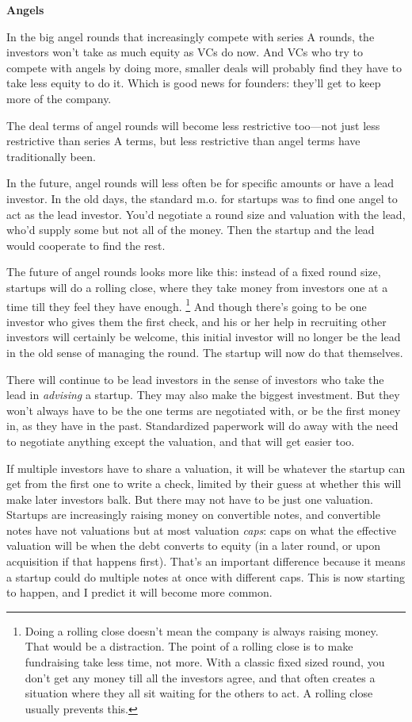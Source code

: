 \textbf{Angels}

In the big angel rounds that increasingly compete with series A rounds,
the investors won't take as much equity as VCs do now. And VCs who try
to compete with angels by doing more, smaller deals will probably find
they have to take less equity to do it. Which is good news for founders:
they'll get to keep more of the company.

The deal terms of angel rounds will become less restrictive too---not
just less restrictive than series A terms, but less restrictive than
angel terms have traditionally been.

In the future, angel rounds will less often be for specific amounts or
have a lead investor. In the old days, the standard m.o. for startups
was to find one angel to act as the lead investor. You'd negotiate a
round size and valuation with the lead, who'd supply some but not all of
the money. Then the startup and the lead would cooperate to find the
rest.

The future of angel rounds looks more like this: instead of a fixed
round size, startups will do a rolling close, where they take money from
investors one at a time till they feel they have enough.
\footnote{Doing a rolling close doesn't mean the company is always raising
money. That would be a distraction. The point of a rolling close is to
make fundraising take less time, not more. With a classic fixed sized
round, you don't get any money till all the investors agree, and that
often creates a situation where they all sit waiting for the others to
act. A rolling close usually prevents this.} And though there's going to be one investor who
gives them the first check, and his or her help in recruiting other
investors will certainly be welcome, this initial investor will no
longer be the lead in the old sense of managing the round. The startup
will now do that themselves.

There will continue to be lead investors in the sense of investors who
take the lead in \emph{advising} a startup. They may also make the
biggest investment. But they won't always have to be the one terms are
negotiated with, or be the first money in, as they have in the past.
Standardized paperwork will do away with the need to negotiate anything
except the valuation, and that will get easier too.

If multiple investors have to share a valuation, it will be whatever the
startup can get from the first one to write a check, limited by their
guess at whether this will make later investors balk. But there may not
have to be just one valuation. Startups are increasingly raising money
on convertible notes, and convertible notes have not valuations but at
most valuation \emph{caps}: caps on what the effective valuation will be
when the debt converts to equity (in a later round, or upon acquisition
if that happens first). That's an important difference because it means
a startup could do multiple notes at once with different caps. This is
now starting to happen, and I predict it will become more common.

